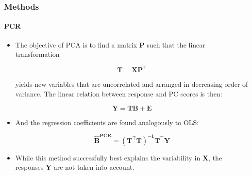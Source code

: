 \documentclass{beamer}
\begin{document}
\begin{frame}
	\frametitle{Methods}
	\framesubtitle{PCR}
	
	\begin{itemize}
	
	\item The objective of PCA is to find a matrix $\mathbf{P}$ such that the linear transformation
	
		\begin{equation}
			\label{eqn:pca}
			\mathbf{T=XP^\intercal}
		\end{equation}
	
yields new variables that are uncorrelated and arranged in decreasing order of variance. The linear relation between response and PC scores is then:

	\begin{equation}
		\label{eqn:pcr}
		\mathbf{Y = T B + E}
	\end{equation}

\item And the regression coefficients are found analogously to OLS:

	\begin{equation}
		\label{eqn:beta-pcr}
		\mathbf{\hat{B}^{\text{PCR}} = (T^\intercal T)^{-1}T^\intercal Y}
	\end{equation}

\item While this method successfully best explains the variability in $\mathbf{X}$, the responses $\mathbf{Y}$ are not taken into account.
\end{itemize}
\end{frame}	
\end{document}
